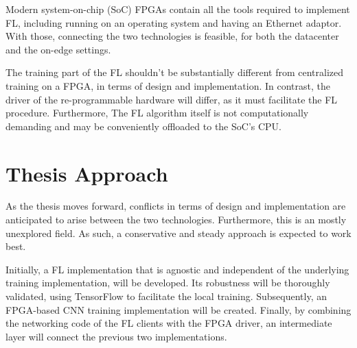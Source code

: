 Modern system-on-chip (SoC) FPGAs contain all the tools required to implement FL, including running on an operating system and having an Ethernet adaptor. With those, connecting the two technologies is feasible, for both the datacenter and the on-edge settings.

The training part of the FL shouldn't be substantially different from centralized training on a FPGA, in terms of design and implementation. In contrast, the driver of the re-programmable hardware will differ, as it must facilitate the FL procedure. Furthermore, The FL algorithm itself is not computationally demanding and may be conveniently offloaded to the SoC's CPU.

\section{Thesis Approach}
As the thesis moves forward, conflicts in terms of design and implementation are anticipated to arise between the two technologies. Furthermore, this is an mostly unexplored field. As such, a conservative and steady approach is expected to work best. 

Initially, a FL implementation that is agnostic and independent of the underlying training implementation, will be developed. Its robustness will be thoroughly validated, using TensorFlow to facilitate the local training. Subsequently, an FPGA-based CNN training implementation will be created. Finally, by combining the networking code of the FL clients with the FPGA driver,
an intermediate layer will connect the previous two implementations.
